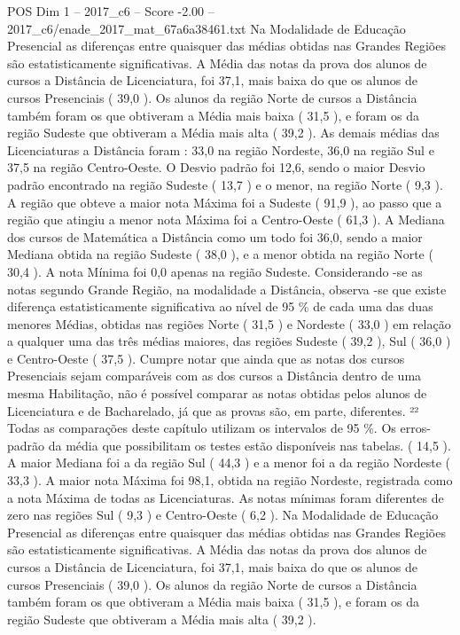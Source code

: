 \begin{textsample}{POS Dim 1 – 2017\_c6 – Score -2.00 – 2017\_c6/enade\_2017\_mat\_67a6a38461.txt}
Na Modalidade de Educação Presencial as diferenças entre quaisquer das médias obtidas nas Grandes Regiões são estatisticamente significativas.
A Média das notas da prova dos alunos de cursos a Distância de Licenciatura, foi 37,1, mais baixa do que os alunos de cursos Presenciais ( 39,0 ).
Os alunos da região Norte de cursos a Distância também foram os que obtiveram a Média mais baixa ( 31,5 ), e foram os da região Sudeste que obtiveram a Média mais alta ( 39,2 ).
As demais médias das Licenciaturas a Distância foram : 33,0 na região Nordeste, 36,0 na região Sul e 37,5 na região Centro-Oeste.
O Desvio padrão foi 12,6, sendo o maior Desvio padrão encontrado na região Sudeste ( 13,7 ) e o menor, na região Norte ( 9,3 ).
A região que obteve a maior nota Máxima foi a Sudeste ( 91,9 ), ao passo que a região que atingiu a menor nota Máxima foi a Centro-Oeste ( 61,3 ).
A Mediana dos cursos de Matemática a Distância como um todo foi 36,0, sendo a maior Mediana obtida na região Sudeste ( 38,0 ), e a menor obtida na região Norte ( 30,4 ).
A nota Mínima foi 0,0 apenas na região Sudeste.
Considerando -se as notas segundo Grande Região, na modalidade a Distância, observa -se que existe diferença estatisticamente significativa ao nível de 95 \% de cada uma das duas menores Médias, obtidas nas regiões Norte ( 31,5 ) e Nordeste ( 33,0 ) em relação a qualquer uma das três médias maiores, das regiões Sudeste ( 39,2 ), Sul ( 36,0 ) e Centro-Oeste ( 37,5 ).
Cumpre notar que ainda que as notas dos cursos Presenciais sejam comparáveis com as dos cursos a Distância dentro de uma mesma Habilitação, não é possível comparar as notas obtidas pelos alunos de Licenciatura e de Bacharelado, já que as provas são, em parte, diferentes. ²² Todas as comparações deste capítulo utilizam os intervalos de 95 \%.
Os erros-padrão da média que possibilitam os testes estão disponíveis nas tabelas. ( 14,5 ).
A maior Mediana foi a da região Sul ( 44,3 ) e a menor foi a da região Nordeste ( 33,3 ).
A maior nota Máxima foi 98,1, obtida na região Nordeste, registrada como a nota Máxima de todas as Licenciaturas.
As notas mínimas foram diferentes de zero nas regiões Sul ( 9,3 ) e Centro-Oeste ( 6,2 ).
Na Modalidade de Educação Presencial as diferenças entre quaisquer das médias obtidas nas Grandes Regiões são estatisticamente significativas.
A Média das notas da prova dos alunos de cursos a Distância de Licenciatura, foi 37,1, mais baixa do que os alunos de cursos Presenciais ( 39,0 ).
Os alunos da região Norte de cursos a Distância também foram os que obtiveram a Média mais baixa ( 31,5 ), e foram os da região Sudeste que obtiveram a Média mais alta ( 39,2 ).

\end{textsample}
